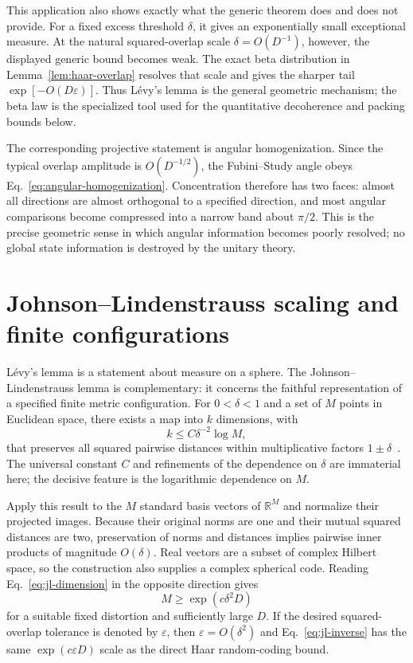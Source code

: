 \documentclass[aps,pra,reprint,superscriptaddress,nofootinbib,longbibliography]{revtex4-2}
\newcommand{\eps}{\varepsilon}
\begin{document}
This application also shows exactly what the generic theorem does and does
not provide.  For a fixed excess threshold $\delta$, it gives an
exponentially small exceptional measure.  At the natural squared-overlap
scale $\delta=O(D^{-1})$, however, the displayed generic bound becomes weak.
The exact beta distribution in Lemma~\ref{lem:haar-overlap} resolves that
scale and gives the sharper tail $\exp[-O(D\eps)]$.  Thus L\'evy's lemma is
the general geometric mechanism; the beta law is the specialized tool used
for the quantitative decoherence and packing bounds below.

The corresponding projective statement is angular homogenization.  Since
the typical overlap amplitude is $O(D^{-1/2})$, the Fubini--Study angle
obeys Eq.~\eqref{eq:angular-homogenization}.  Concentration therefore has two
faces: almost all directions are almost orthogonal to a specified direction,
and most angular comparisons become compressed into a narrow band about
$\pi/2$.  This is the precise geometric sense in which angular information
becomes poorly resolved; no global state information is destroyed by the
unitary theory.

\section{Johnson--Lindenstrauss scaling and finite configurations}
\label{sec:jl}

L\'evy's lemma is a statement about measure on a sphere.  The
Johnson--Lindenstrauss lemma is complementary: it concerns the faithful
representation of a specified finite metric configuration.  For
$0<\delta<1$ and a set of $M$ points in Euclidean space, there exists a map
into $k$ dimensions, with
\begin{equation}
 k\leq C\delta^{-2}\log M,
 \label{eq:jl-dimension}
\end{equation}
that preserves all squared pairwise distances within multiplicative factors
$1\pm\delta$~\cite{johnson-1984}.  The universal constant $C$ and refinements
of the dependence on $\delta$ are immaterial here; the decisive feature is
the logarithmic dependence on $M$.

Apply this result to the $M$ standard basis vectors of $\mathbb R^M$ and
normalize their projected images.  Because their original norms are one and
their mutual squared distances are two, preservation of norms and distances
implies pairwise inner products of magnitude $O(\delta)$.  Real vectors are
a subset of complex Hilbert space, so the construction also supplies a
complex spherical code.  Reading Eq.~\eqref{eq:jl-dimension} in the opposite
direction gives
\begin{equation}
 M\geq\exp(c\delta^2D)
 \label{eq:jl-inverse}
\end{equation}
for a suitable fixed distortion and sufficiently large $D$.  If the desired
squared-overlap tolerance is denoted by $\eps$, then
$\eps=O(\delta^2)$ and Eq.~\eqref{eq:jl-inverse} has the same
$\exp(c\eps D)$ scale as the direct Haar random-coding bound.
\end{document}
